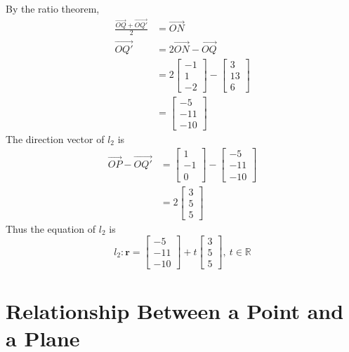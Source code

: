 \documentclass[11pt,a4paper]{book}
\newcommand{\R}{\mathbb{R}}
\begin{document}
\begin{example}
\begin{enumerate}[label=(\alph*)]
By the ratio theorem,
\begin{align*}
\frac{\overrightarrow{OQ}+\overrightarrow{OQ'}}{2} & =\overrightarrow{ON}\\
\overrightarrow{OQ'} & =2\overrightarrow{ON}-\overrightarrow{OQ}\\
 & =2\begin{bmatrix}-1\\
1\\
-2
\end{bmatrix}-\begin{bmatrix}3\\
13\\
6
\end{bmatrix}\\
 & =\begin{bmatrix}-5\\
-11\\
-10
\end{bmatrix}
\end{align*}
The direction vector of $l_{2}$ is
\begin{align*}
\overrightarrow{OP}-\overrightarrow{OQ'} & =\begin{bmatrix}1\\
-1\\
0
\end{bmatrix}-\begin{bmatrix}-5\\
-11\\
-10
\end{bmatrix}\\
 & =2\begin{bmatrix}3\\
5\\
5
\end{bmatrix}
\end{align*}
Thus the equation of $l_{2}$ is
\[
l_{2}:\textbf{r}=\begin{bmatrix}-5\\
-11\\
-10
\end{bmatrix}+t\begin{bmatrix}3\\
5\\
5
\end{bmatrix},\:t\in\R
\]

\end{enumerate}
\end{example}

\section{Relationship Between a Point and a Plane}
\end{document}
